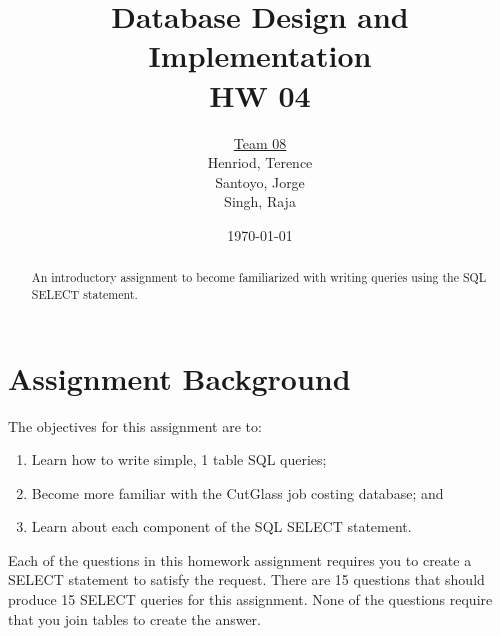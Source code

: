\documentclass{article}
\title{Database Design and Implementation \\ HW 04}
\author{\underline{Team 08}\\Henriod, Terence\\Santoyo, Jorge\\Singh, Raja}
\date{\today}
\begin{document}
\clearpage
\maketitle
\thispagestyle{empty} %

\begin{abstract}
An introductory assignment to become familiarized with writing queries using the SQL SELECT statement.
\end{abstract}

\newpage
\section{Assignment Background}
The objectives for this assignment are to:
\begin{enumerate}
  \item Learn how to write simple, 1 table SQL queries;
  \item Become more familiar with the CutGlass job costing database; and
  \item Learn about each component of the SQL SELECT statement.
\end{enumerate}
Each of the questions in this homework assignment requires you to create a SELECT statement to satisfy the request. There are 15 questions that should produce 15 SELECT queries for this assignment. None of the questions require that you join tables to create the answer. 

\newpage
\end{document}
